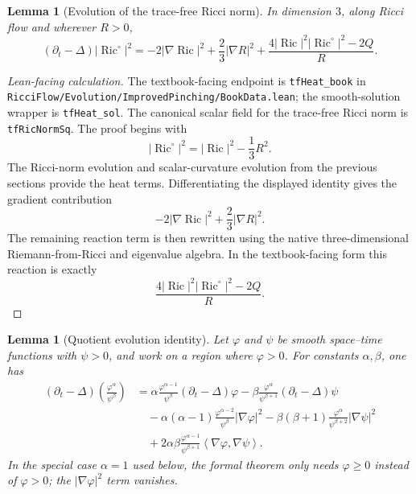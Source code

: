 \documentclass[11pt]{article}
\theoremstyle{plain}
\newtheorem{lemma}[theorem]{Lemma}
\theoremstyle{definition}
\theoremstyle{remark}
\newcommand{\Ric}{\operatorname{Ric}}
\newcommand{\ip}[2]{\left\langle #1,#2\right\rangle}
\newcommand{\norm}[1]{\left|#1\right|}
\newcommand{\leanref}[1]{\nolinkurl{#1}}
\newcommand{\leanfile}[1]{\nolinkurl{#1}}
\newcommand{\rffile}[1]{\leanfile{#1}}
\begin{document}
\begin{lemma}[Evolution of the trace-free Ricci norm]
\label{lem:evol-tracefree-ricci-norm}
In dimension $3$, along Ricci flow and wherever $R>0$,
\[
(\partial_t-\Delta)\norm{\Ric^\circ}^2
=
-2\norm{\nabla\Ric}^2
+\frac23\norm{\nabla R}^2
+
\frac{4\norm{\Ric}^2\norm{\Ric^\circ}^2-2Q}{R}.
\]
\end{lemma}

\begin{proof}[Lean-facing calculation]
The textbook-facing endpoint is \leanref{tfHeat_book} in
\rffile{RicciFlow/Evolution/ImprovedPinching/BookData.lean}; the
smooth-solution wrapper is \leanref{tfHeat_sol}.  The canonical scalar field
for the trace-free Ricci norm is \leanref{tfRicNormSq}.  The proof begins with
\[
\norm{\Ric^\circ}^2=\norm{\Ric}^2-\frac13R^2.
\]
The Ricci-norm evolution and scalar-curvature evolution from the previous
sections provide the heat terms.  Differentiating the displayed identity gives
the gradient contribution
\[
-2\norm{\nabla\Ric}^2+\frac23\norm{\nabla R}^2.
\]
The remaining reaction term is then rewritten using the native three-dimensional
Riemann-from-Ricci and eigenvalue algebra.  In the textbook-facing form this
reaction is exactly
\[
\frac{4\norm{\Ric}^2\norm{\Ric^\circ}^2-2Q}{R}.
\]
\end{proof}

\begin{lemma}[Quotient evolution identity]
\label{lem:quotient-evolution}
Let $\varphi$ and $\psi$ be smooth space--time functions with $\psi>0$, and work
on a region where $\varphi>0$. For constants $\alpha,\beta$, one has
\begin{align*}
(\partial_t-\Delta)\left(\frac{\varphi^\alpha}{\psi^\beta}\right)
&=
\alpha\frac{\varphi^{\alpha-1}}{\psi^\beta}(\partial_t-\Delta)\varphi
-
\beta\frac{\varphi^\alpha}{\psi^{\beta+1}}(\partial_t-\Delta)\psi
\\
&\quad
-
\alpha(\alpha-1)\frac{\varphi^{\alpha-2}}{\psi^\beta}\norm{\nabla\varphi}^2
-
\beta(\beta+1)\frac{\varphi^\alpha}{\psi^{\beta+2}}\norm{\nabla\psi}^2
\\
&\quad
+
2\alpha\beta\frac{\varphi^{\alpha-1}}{\psi^{\beta+1}}
\ip{\nabla\varphi}{\nabla\psi}.
\end{align*}
In the special case \(\alpha=1\) used below, the formal theorem only needs
\(\varphi\ge0\) instead of \(\varphi>0\); the
\(\norm{\nabla\varphi}^2\) term vanishes.
\end{lemma}
\end{document}
